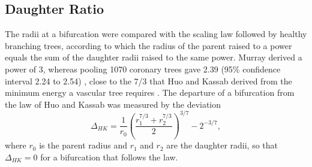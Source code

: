 \subsection{Daughter Ratio}
\label{sec:method-ratio}

The radii at a bifurcation were compared with the scaling law followed by healthy branching trees,
according to which the radius of the parent raised to a power equals the sum of the daughter radii
raised to the same power.
Murray derived a power of 3, whereas pooling 1070 coronary trees gave 2.39 (95\% confidence interval
2.24 to 2.54) \cite{taylor2024murray}, close to the 7/3 that Huo and Kassab derived from the minimum
energy a vascular tree requires \cite{huo2012scaling}.
The departure of a bifurcation from the law of Huo and Kassab was measured by the deviation
\begin{equation}
  \Delta_{HK} = \frac{1}{r_0}\left(\frac{r_1^{7/3} + r_2^{7/3}}{2}\right)^{3/7} - 2^{-3/7},
  \label{eq:method-hk}
\end{equation}
where $r_0$ is the parent radius and $r_1$ and $r_2$ are the daughter radii, so that
$\Delta_{HK} = 0$ for a bifurcation that follows the law.
